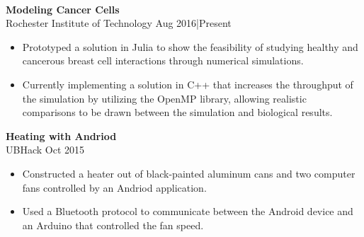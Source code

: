 \documentclass[10pt]{article}
\newcommand{\rsection}[1]{\noindent{\Large{\bfseries{\scshape\color{high}#1}}}}
\newcommand{\job}[4]{
	\textbf{#1}\\ #2 \hfill #3|#4 \vspace{-.05in}
}
\newcommand{\proj}[3]{
	\textbf{#1}\\ #2 \hfill #3 \vspace{-.05in}
}
\newcommand{\dash}{\item[-]\vspace{-.05cm}}
\begin{document}
\begin{minipage}[t]{0.7\linewidth}
\begin{itemize}
\end{itemize} 
 \vspace{0cm} 
\rsection{Projects}\\
\job{Modeling Cancer Cells}{Rochester Institute of Technology}{Aug 2016}{Present}
\begin{itemize}
	\dash Prototyped a solution in Julia to show the feasibility of studying healthy and cancerous breast cell interactions through numerical simulations. 
	\dash Currently implementing a solution in C++ that increases the throughput of the simulation by utilizing the OpenMP library, allowing realistic comparisons to be drawn between the simulation and biological results.
\end{itemize}
\proj{Heating with Andriod}{UBHack}{Oct 2015} 
\begin{itemize} 
	\dash Constructed a heater out of black-painted aluminum cans and two computer fans controlled by an Andriod application.
	\dash Used a Bluetooth protocol to communicate between the Android device and an Arduino that controlled the fan speed. 
\end{itemize}
\end{minipage}
\end{document}
